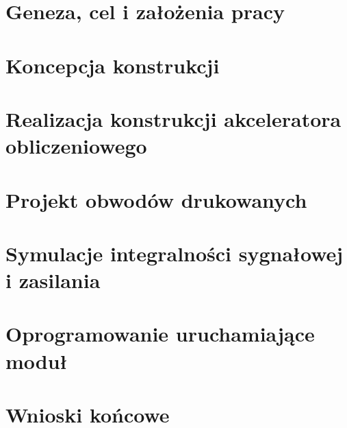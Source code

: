 \documentclass{praca_mgr_pw_mod}
\begin{document}
\chapter{Geneza, cel i założenia pracy}
\label{chapt:geneza}


\chapter{Koncepcja konstrukcji}
\label{chapt:koncepcja}


\chapter{Realizacja konstrukcji akceleratora obliczeniowego}
\label{chapt:czesc_ukladowa}


\chapter{Projekt obwodów drukowanych}
\label{chapt:projekt_pcb}


\chapter{Symulacje integralności sygnałowej i zasilania}
\label{chapt:symulacje}


\chapter{Oprogramowanie uruchamiające moduł}
\label{chapt:oprogramowanie}


%

\chapter{Wnioski końcowe}
\label{chapt:wnioski}


\begin{appendices}
\label{chapt:dodatki}

\end{appendices}
%



\end{document}
